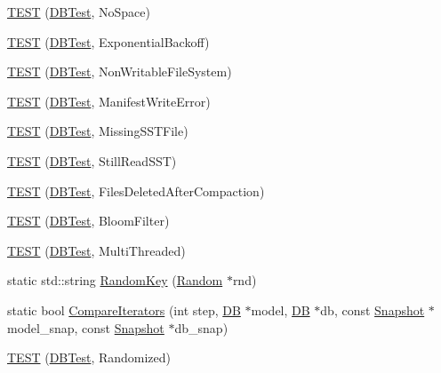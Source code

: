 \begin{DoxyCompactItemize}
\item 
\hyperlink{namespaceleveldb_a11f56de4abca34391c0e60f311262b65}{T\-E\-S\-T} (\hyperlink{classleveldb_1_1_d_b_test}{D\-B\-Test}, No\-Space)
\item 
\hyperlink{namespaceleveldb_a2eb704bdb3447d5feea4c127b90b1192}{T\-E\-S\-T} (\hyperlink{classleveldb_1_1_d_b_test}{D\-B\-Test}, Exponential\-Backoff)
\item 
\hyperlink{namespaceleveldb_a9d69b380c464519a1b946fb1faa21cbd}{T\-E\-S\-T} (\hyperlink{classleveldb_1_1_d_b_test}{D\-B\-Test}, Non\-Writable\-File\-System)
\item 
\hyperlink{namespaceleveldb_a071c4940c40a4eed0d3e4e4044a227a6}{T\-E\-S\-T} (\hyperlink{classleveldb_1_1_d_b_test}{D\-B\-Test}, Manifest\-Write\-Error)
\item 
\hyperlink{namespaceleveldb_a8e750f4502e214132281fd755d26c175}{T\-E\-S\-T} (\hyperlink{classleveldb_1_1_d_b_test}{D\-B\-Test}, Missing\-S\-S\-T\-File)
\item 
\hyperlink{namespaceleveldb_ab4a8284a6c982c710e6e84af0d6040a9}{T\-E\-S\-T} (\hyperlink{classleveldb_1_1_d_b_test}{D\-B\-Test}, Still\-Read\-S\-S\-T)
\item 
\hyperlink{namespaceleveldb_a47755684dc15db851e0174ea9475e97c}{T\-E\-S\-T} (\hyperlink{classleveldb_1_1_d_b_test}{D\-B\-Test}, Files\-Deleted\-After\-Compaction)
\item 
\hyperlink{namespaceleveldb_a6d54978f51e046c170696cbb320f23f1}{T\-E\-S\-T} (\hyperlink{classleveldb_1_1_d_b_test}{D\-B\-Test}, Bloom\-Filter)
\item 
\hyperlink{namespaceleveldb_a9bee47c386abe6004d884f2552bd8184}{T\-E\-S\-T} (\hyperlink{classleveldb_1_1_d_b_test}{D\-B\-Test}, Multi\-Threaded)
\item 
static std\-::string \hyperlink{namespaceleveldb_a1c336258072dc26d61cabcda6bc2db75}{Random\-Key} (\hyperlink{classleveldb_1_1_random}{Random} $\ast$rnd)
\item 
static bool \hyperlink{namespaceleveldb_a5d2ddf843172352a05569e55d7b84a13}{Compare\-Iterators} (int step, \hyperlink{classleveldb_1_1_d_b}{D\-B} $\ast$model, \hyperlink{classleveldb_1_1_d_b}{D\-B} $\ast$db, const \hyperlink{classleveldb_1_1_snapshot}{Snapshot} $\ast$model\-\_\-snap, const \hyperlink{classleveldb_1_1_snapshot}{Snapshot} $\ast$db\-\_\-snap)
\item 
\hyperlink{namespaceleveldb_a028ed215c12e1998d7073b18fce4c24c}{T\-E\-S\-T} (\hyperlink{classleveldb_1_1_d_b_test}{D\-B\-Test}, Randomized)
\item 

\end{DoxyCompactItemize}
